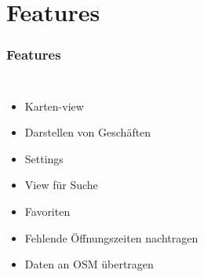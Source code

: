 \documentclass[hyperref]{beamer}
\begin{document}
\section{Features}

\begin{frame}
  \frametitle{Features}
  \begin{columns}
  \column{5.1cm}
  	\begin{itemize}
  	  \item Karten-view
      \item Darstellen von Geschäften
      \item Settings
      \item View für Suche
      \item Favoriten
      \item Fehlende Öffnungszeiten nachtragen
      \item Daten an OSM übertragen
    \end{itemize}
  \column{5cm}
  \end{columns}
\end{frame}
\end{document}

